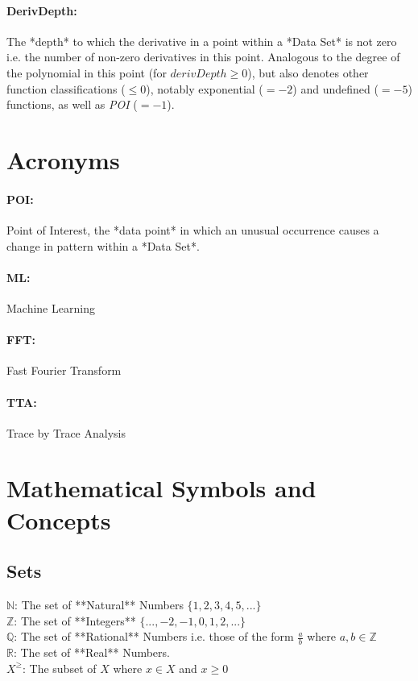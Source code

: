 \documentclass[main.tex]{subfiles}
\begin{document}
    \paragraph{DerivDepth:} The *depth* to which the derivative in a point within a *Data Set* is not zero i.e. the number of non-zero derivatives in this point. Analogous to the degree of the polynomial in this point (for $derivDepth \geq 0$), but also denotes other function classifications ($\leq 0$), notably exponential ($=-2$) and undefined ($=-5$) functions, as well as \textit{POI} ($=-1$).
  
  \section{Acronyms}
     
    \paragraph{POI:} Point of Interest, the *data point* in which an unusual occurrence causes a change in pattern within a *Data Set*.
    
    \paragraph{ML:} Machine Learning
    
    \paragraph{FFT:} Fast Fourier Transform
    
    \paragraph{TTA:} Trace by Trace Analysis
  
  \section{Mathematical Symbols and Concepts}
  
    \subsection{Sets}
    
      $\mathbb{N}$: The set of **Natural** Numbers $\{1,2,3,4,5,...\}$
      \\
      $\mathbb{Z}$: The set of **Integers** $\{...,-2,-1,0,1,2,...\}$
      \\
      $\mathbb{Q}$: The set of **Rational** Numbers i.e. those of the form $\frac{a}{b}$ where $a,b \in \mathbb{Z}$
      \\
      $\mathbb{R}$: The set of **Real** Numbers.
      \\
      $X^{\geq}$: The subset of $X$ where $x \in X$ and $x\geq0$
   
\end{document}
